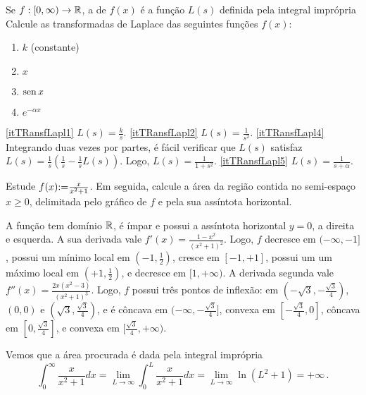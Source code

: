 \begin{exo}
Se $f:[0,\infty)\to \mathbb{R}$, a  de $f(x)$ é a
função $L(s)$ definida pela integral imprópria
Calcule as transformadas de Laplace das seguintes funções $f(x)$:
\begin{multicols}{4}
\begin{enumerate}
\item\label{itTRansfLapl1} $k$ (constante)
\item\label{itTRansfLapl2} $x$
\item\label{itTRansfLapl4} $\operatorname{sen} x$
\item\label{itTRansfLapl5} $e^{-\alpha x}$
\end{enumerate}
\end{multicols}
\vspace{0.01cm}
\begin{sol}
\eqref{itTRansfLapl1} $L(s)=\frac{k}{s}$.
\eqref{itTRansfLapl2} $L(s)=\frac{1}{s^2}$.
\eqref{itTRansfLapl4} Integrando duas vezes por partes, é fácil
verificar que $L(s)$ satisfaz $L(s)=\frac{1}{s}(\frac{1}{s}-\frac{1}{s}L(s))$.
Logo, $L(s)=\frac{1}{1+s^2}$.
\eqref{itTRansfLapl5} $L(s)=\frac{1}{s+\alpha}$.
\end{sol}
\end{exo}

\begin{exo} Estude $f(x){:=} \frac{x}{x^2+1}$. Em seguida, 
calcule a área da região contida no semi-espaço $x\geq 0$, delimitada pelo
gráfico de $f$ e pela sua assíntota horizontal.
\begin{sol}
A função tem domínio $\mathbb{R}$, é ímpar e possui a assíntota horizontal 
$y=0$, a
direita e esquerda.
A sua derivada vale $f'(x)=\frac{1-x^2}{(x^2+1)^2}$. Logo, $f$ decresce em
$(-\infty,-1]$, possui um mínimo local em $(-1,\tfrac{1}{2})$, cresce em
$[-1,+1]$, possui um
um máximo local em $(+1,\tfrac{1}{2})$, e decresce em $[1,+\infty)$.
A derivada segunda vale $f''(x)=\frac{2x(x^2-3)}{(x^2+1)^3}$. Logo, $f$ possui
três pontos de inflexão: em $(-\sqrt{3},-\frac{\sqrt{3}}{4})$,
$(0,0)$ e $(\sqrt{3},\frac{\sqrt{3}}{4})$, e é côncava em
$(-\infty,-\frac{\sqrt{3}}{4}]$, convexa em $[-\tfrac{\sqrt{3}}{4},0]$, côncava
em $[0,\tfrac{\sqrt{3}}{4}]$, e convexa em
$[\tfrac{\sqrt{3}}{4},+\infty)$.
\begin{center}
\begin{bmlimage}\end{bmlimage}
\end{center}
Vemos que a área procurada é dada pela integral imprópria
$$
\int_0^\infty\frac{x}{x^2+1}dx=\lim_{L\to\infty}\int_0^L\frac{x}{x^2+1}dx=\lim_{
L\to\infty} \ln (L^2+1)=+\infty\,.
$$
\end{sol}
\end{exo}

